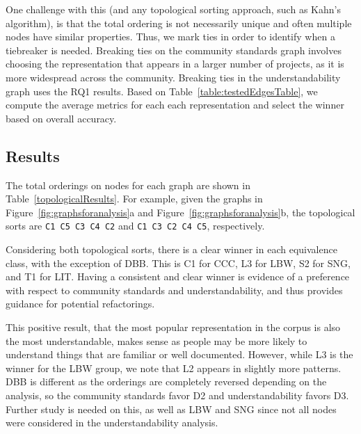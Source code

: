 One challenge with this (and any topological sorting approach, such as Kahn's algorithm), is that the total ordering is not necessarily unique and often multiple nodes have similar properties. 
Thus, we mark ties in order to identify when a tiebreaker is needed.
Breaking ties on the community standards graph involves choosing the representation that appears in a larger number of projects, as it is more widespread across the community. 
Breaking ties in the understandability graph uses the RQ1 results. Based on Table~\ref{table:testedEdgesTable}, we compute the average metrics for each each representation and select the winner based on overall accuracy. 

\subsection{Results}
The total orderings on nodes for each graph are shown in Table~\ref{topologicalResults}.  For example, given the graphs in Figure~\ref{fig:graphsforanalysis}a and Figure~\ref{fig:graphsforanalysis}b, the topological sorts are {\tt C1 C5 C3 C4 C2} and  {\tt C1 C3 C2 C4 C5}, respectively.



Considering both topological sorts, there is a clear winner in each equivalence class, with the exception of DBB.
This is C1 for CCC, L3 for LBW, S2 for SNG, and T1 for LIT.
Having a consistent and clear winner is evidence of a preference with respect to community standards and understandability, and thus provides guidance for potential refactorings.

This positive result, that the most popular representation in the corpus is also the most understandable, makes sense as people may be more likely to understand things that are familiar or well documented. However, while L3 is the winner for the LBW group, we note that L2 appears in slightly more patterns.
DBB is different  as the orderings are completely reversed depending on the analysis, so the community standards favor D2 and understandability favors D3. Further study is needed on this, as well as  LBW and SNG since not all nodes were considered in the understandability analysis. 
%

